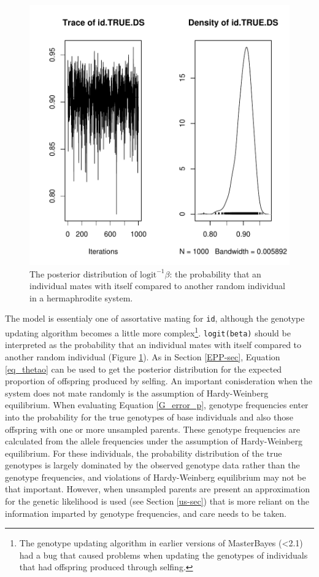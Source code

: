 \documentclass{article}
\begin{document}
\begin{figure}[!h]
\begin{center}
\includegraphics{Tutorial-093}
\end{center}
\caption{The posterior distribution of $\textrm{logit}^{-1}\beta$: the probability that an individual mates with itself compared to another random individual in a hermaphrodite system.}
\label{Herm-fig}
\end{figure}


The model is essentialy one of assortative mating for \texttt{id}, although the genotype updating algorithm becomes a little more complex\footnote{The genotype updating algorithm in earlier versions of MasterBayes (<2.1) had a bug that caused problems when updating the genotypes of individuals that had offspring produced through selfing.}.  \texttt{logit(beta)} should be interpreted as the probability that an individual mates with itself compared to another random individual (Figure \ref{Herm-fig}).  As in Section \ref{EPP-sec}, Equation \ref{eq_thetao} can be used to get the posterior distribution for the expected proportion of offspring produced by selfing.  An important conisderation when the system does not mate randomly is the assumption of Hardy-Weinberg equilibrium.  When evaluating Equation \ref{G_error_p}, genotype frequencies enter into the probability for the true genotypes of base individuals and also those offspring with one or more unsampled parents. These genotype frequencies are calculated from the allele frequencies under the assumption of Hardy-Weinberg equilibrium. For these individuals, the probability distribution of the true genotypes is largely dominated by the observed genotype data rather than the genotype frequencies, and violations of Hardy-Weinberg equilibrium may not be that important.  However, when unsampled parents are present an approximation for the genetic likelihood is used (see Section \ref{us-sec}) that is more reliant on the information imparted by genotype frequencies, and care needs to be taken. 
\end{document}
